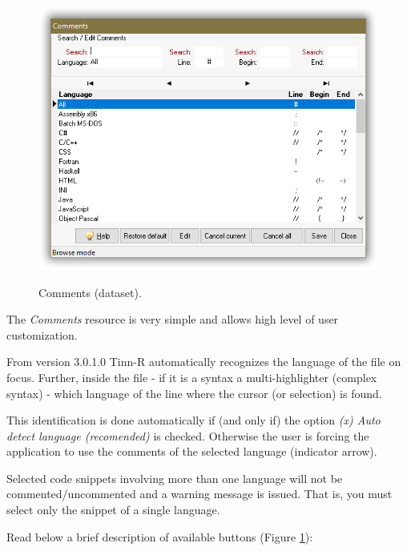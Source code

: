 \begin{figure}[H]
  \includegraphics[scale=0.8]{./res/dlg_comments.png}\\
  \caption{Comments (dataset).}
  \label{fig:dlg_comments}
\end{figure}
The \textit{Comments} resource is very simple and allows high level
of user customization.

From version 3.0.1.0 Tinn-R automatically recognizes the
language of the file on focus. Further, inside the file
- if it is a syntax a multi-highlighter (complex syntax) - which language of
the line where the cursor (or selection) is found.

This identification is done automatically if (and only if) the option
\textit{(x) Auto detect language (recomended)} is checked. Otherwise
the user is forcing the application to use the comments of the selected language
(indicator arrow).

Selected code snippets involving more than one language will not be commented/uncommented
and a warning message is issued. That is, you must select only the snippet of a single language.

Read below a brief description of available buttons (Figure \ref{fig:dlg_comments}):

